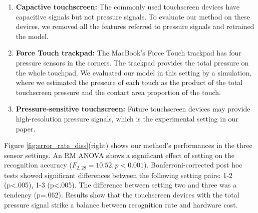 \begin{enumerate}
	\item{\textbf{Capactive touchscreen:} The commonly used touchscreen devices have capacitive signals but not pressure signals. To evaluate our method on these devices, we removed all the features referred to pressure signals and retrained the model.}
	\item{\textbf{Force Touch trackpad:} The MacBook's Force Touch trackpad has four pressure sensors in the corners. The trackpad provides the total pressure on the whole touchpad. We evaluated our model in this setting by a simulation, where we estimated the pressure of each touch as the product of the total touchscreen pressure and the contact area proportion of the touch.}
	\item{\textbf{Pressure-sensitive touchscreen:} Future touchscreen devices may provide high-resolution pressure signals, which is the experimental setting in our paper.}
\end{enumerate}



Figure \ref{fig:error_rate_diss}(right) shows our method's performances in the three sensor settings. An RM ANOVA shows a significant effect of setting on the recognition accuracy ($F_{2,28}=10.52, p<0.001$). Bonferroni-corrected post hoc tests showed significant differences between the following setting pairs: 1-2 (p<.005), 1-3 (p<.005). The difference between setting two and three was a tendency (p=.062). Results show that the touchscreen devices with the total pressure signal strike a balance between recognition rate and hardware cost.

